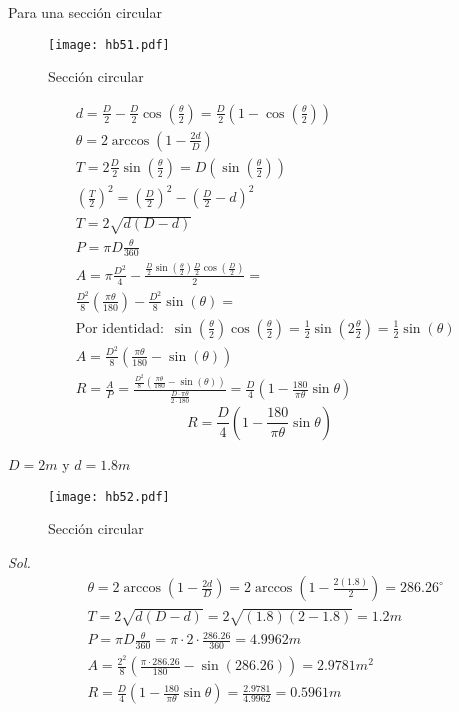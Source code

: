 \begin{example}
    Para una sección circular
\end{example}
\begin{figure}[h!]
\centering
  \texttt{[image: hb51.pdf]}
  \caption{Sección circular}
  \label{hb51}
\end{figure}
\begin{align*}
    &d=\frac{D}{2}-\frac{D}{2}\cos{\left(\frac{\theta}{2}\right)}=\frac{D}{2}\left(1-\cos{\left(\frac{\theta}{2}\right)}\right)\\
    &\theta=2\arccos{\left(1-\frac{2d}{D}\right)}\\
    &T=2\frac{D}{2}\sin{\left(\frac{\theta}{2}\right)}=D\left(\sin{\left(\frac{\theta}{2}\right)}\right)\\
    &\left(\frac{T}{2}\right)^2=\left(\frac{D}{2}\right)^2-\left(\frac{D}{2}-d\right)^2\\
    &T=2\sqrt{d(D-d)}\\
    &P=\pi D\frac{\theta}{360}\\
    &A=\pi\frac{D^2}{4}-\frac{\frac{D}{2}\sin{\left(\frac{\theta}{2}\right)}\frac{D}{2}\cos{\left(\frac{D}{2}\right)}}{2}=\\
    &\frac{D^2}{8}\left(\frac{\pi \theta}{180}\right)-\frac{D^2}{8}\sin{(\theta)}=\\
    &\text{Por identidad: }\, \sin{\left(\frac{\theta}{2}\right)}\cos{\left(\frac{\theta}{2}\right)}=\frac{1}{2}\sin{\left(2\frac{\theta}{2}\right)}=\frac{1}{2}\sin{(\theta)}\\ 
    &A=\frac{D^2}{8}\left(\frac{\pi\theta}{180}-\sin{(\theta)}\right)\\
    &R=\frac{A}{P}=\frac{\frac{D^2}{8}\left(\frac{\pi\theta}{180}-\sin{(\theta)}\right)}{\frac{D\cdot \pi\theta}{2\cdot 180}}=\frac{D}{4}\left(1-\frac{180}{\pi\theta}\sin{\theta}\right)
\end{align*}
\begin{equation}
    R=\frac{D}{4}\left(1-\frac{180}{\pi\theta}\sin{\theta}\right)
\end{equation}

\begin{problem}
    $D=2m$ y $d=1.8m$
\end{problem}

\begin{figure}[h!]
\centering
  \texttt{[image: hb52.pdf]}
  \caption{Sección circular}
  \label{hb52}
\end{figure}
\textit{ Sol. }
\begin{align*}
    &\theta=2\arccos{\left(1-\frac{2d}{D}\right)}=2\arccos{\left(1-\frac{2(1.8)}{2}\right)}=286.26^{\circ}\\
    &T=2\sqrt{d(D-d)}=2\sqrt{(1.8)(2-1.8)}=1.2m\\
    &P=\pi D\frac{\theta}{360}=\pi\cdot 2\cdot\frac{286.26}{360}=4.9962m\\
    &A=\frac{2^2}{8}\left(\frac{\pi\cdot 286.26}{180}-\sin{(286.26)}\right)=2.9781m^2\\
    &R=\frac{D}{4}\left(1-\frac{180}{\pi\theta}\sin{\theta}\right)=\frac{2.9781}{4.9962}=0.5961m
\end{align*}

